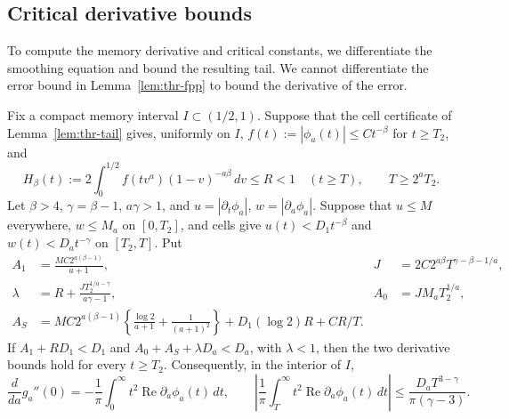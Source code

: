 \subsection{Critical derivative bounds}
\label{or:transition-unique}

To compute the memory derivative and critical constants, we
differentiate the smoothing equation and bound the resulting tail.
We cannot differentiate the error bound in Lemma~\ref{lem:thr-fpp}
to bound the derivative of the error.

\begin{lemma}\label{lem:thr-parameter-tail}
Fix a compact memory interval $I\subset(1/2,1)$. Suppose that the
cell certificate of Lemma~\ref{lem:thr-tail} gives, uniformly on $I$,
$f(t):=|\phi_a(t)|\le Ct^{-\beta}$ for $t\ge T_2$, and
\[
 H_\beta(t):=2\int_0^{1/2}f(tv^a)(1-v)^{-a\beta}\,dv\le R<1
 \quad(t\ge T),\qquad T\ge2^aT_2.
\]
Let $\beta>4$, $\gamma=\beta-1$, $a\gamma>1$, and
$u=|\partial_t\phi_a|$, $w=|\partial_a\phi_a|$.
Suppose that $u\le M$ everywhere, $w\le M_a$ on $[0,T_2]$, and
cells give $u(t)<D_1t^{-\beta}$ and $w(t)<D_at^{-\gamma}$ on $[T_2,T]$.
Put
\begin{align*}
 A_1&=\frac{MC2^{a(\beta-1)}}{a+1},&
 J&=2C2^{a\beta}T^{\gamma-\beta-1/a},\\
 \lambda&=R+\frac{JT_2^{1/a-\gamma}}{a\gamma-1},&
 A_0&=JM_aT_2^{1/a},\\
 A_S&=MC2^{a(\beta-1)}
 \left\{\frac{\log2}{a+1}+\frac1{(a+1)^2}\right\}
       +D_1(\log2)R+CR/T.
\end{align*}
If $A_1+RD_1<D_1$ and $A_0+A_S+\lambda D_a<D_a$, with
$\lambda<1$, then the two derivative bounds hold for every $t\ge T_2$.
Consequently, in the interior of $I$,
\begin{equation}\label{eq:thr-memory-derivative}
 \frac{d}{da}g_a''(0)=-\frac1\pi\int_0^\infty
 t^2\operatorname{Re}\partial_a\phi_a(t)\,dt,
 \qquad
 \left|\frac1\pi\int_T^\infty t^2
 \operatorname{Re}\partial_a\phi_a(t)\,dt\right|
 \le\frac{D_aT^{3-\gamma}}{\pi(\gamma-3)}.
\end{equation}
\end{lemma}


